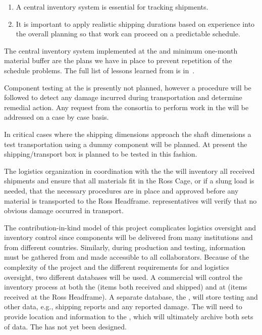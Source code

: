 \begin{enumerate}
\item A central inventory system is essential for tracking  shipments.
\item 
It is important to apply realistic shipping durations based on experience into the overall planning so that work can proceed on a predictable schedule. 
 
\end{enumerate}

The central inventory system  implemented at the   and minimum one-month material buffer are the plans we have in place to prevent repetition of the  schedule problems. 
The full list of lessons learned from  is in~\cite{bib:docdb8255}. 

Component testing at the  is presently not planned, however a   procedure will be followed to detect any damage incurred during transportation and determine remedial action. Any request from the consortia to perform work in the  will be addressed on a case by case basis.

In critical cases where the shipping dimensions approach the shaft dimensions a test transportation using a dummy component will be planned. At present the  shipping/transport box is planned to be tested in this fashion.
 
The logistics organization in coordination with the the  will inventory all received shipments and  ensure that all materials fit in the Ross Cage, or if a slung load is needed, that the necessary procedures are in place and approved before any material is transported to the Ross Headframe.  
 representatives will verify that no obvious damage occurred in transport. 

The contribution-in-kind model of this project complicates logistics oversight and inventory control since components will be delivered from many institutions and from different countries. 
Similarly, during production and testing,  information must be gathered from and made accessible to all collaborators. 
Because of the complexity of the project and the different requirements for  and logistics oversight, two different databases will be used. 
A commercial  will control the inventory process at both the  (items both received and shipped) and at  (items received at the Ross Headframe). 
A  separate database, the , will store testing and other  data, e.g.,  shipping reports and any reported damage. 
The  will need to provide location and   information to the , which will ultimately archive both sets of data. 
The  has not yet been designed.

